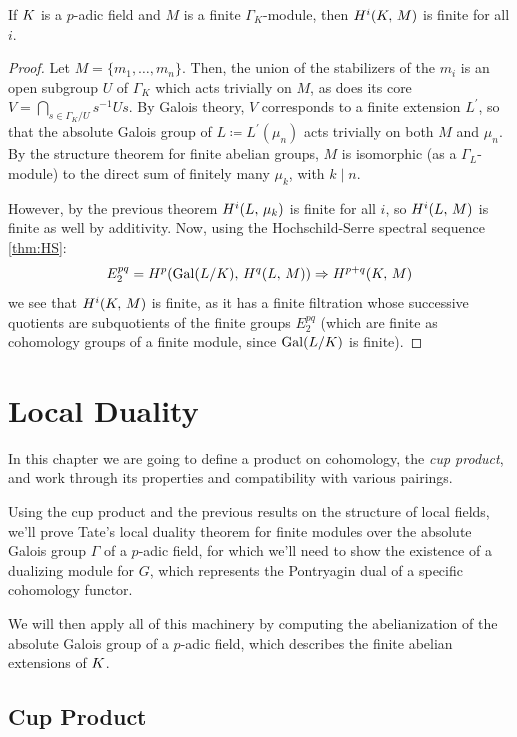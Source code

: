 \documentclass[a4paper, oneside]{memoir}
\begin{document}
\begin{corollary}\label{cor:FinCohom}
	If $K$ is a $p$-adic field and $M$ is a finite $\Gamma_K$-module, then
	\(H^{i}( K, \, M )\) is finite for all $i$.
\end{corollary}
\begin{proof}
	Let $M=\{m_1,\ldots,m_n\}$. Then, the union of the stabilizers of the $m_i$ is an open subgroup $U$ of $\Gamma_K$ which acts trivially on $M$, as does its core $V=\bigcap_{s\in \Gamma_K / U}{s^{-1}U s}$. By Galois theory, $V$ corresponds to a finite extension $L^{\prime}$, so that the absolute Galois group of $L\coloneqq L^{\prime}(\mu_n)$ acts trivially on both $M$ and $\mu_n$. By the structure theorem for finite abelian groups, $M$ is isomorphic (as a $\Gamma_L$-module) to the direct sum of finitely many $\mu_k$, with $k\mid n$.

	However, by the previous theorem $H^{i}( L, \, \mu_k )$ is finite for all $i$, so $H^{i}( L, \, M )$ is finite as well by additivity. Now, using the Hochschild-Serre spectral sequence \eqref{thm:HS}:
	\[
		E_2^{pq}= H^{p}( \mathrm{Gal}{(L / K)}, \, H^{q}( L, \, M ) ) \Rightarrow H^{p+q}( K, \, M )
	\]
	we see that $H^{i}( K, \, M )$ is finite, as it has a finite filtration whose successive quotients are subquotients of the finite groups $E_2^{pq}$ (which are finite as cohomology groups of a finite module, since $\mathrm{Gal}(L /K)$ is finite).
\end{proof}




\chapter{Local Duality}
In this chapter we are going to define a product on cohomology, the \textit{cup product}, and work through its properties and compatibility with various pairings.

Using the cup product and the previous results on the structure of local fields, we'll prove Tate's local duality theorem for finite modules over the absolute Galois group $\Gamma$ of a $p$-adic field, for which we'll need to show the existence of a dualizing module for $G$, which represents the Pontryagin dual of a specific cohomology functor.

We will then apply all of this machinery by computing the abelianization of the absolute Galois group of a $p$-adic field, which describes the finite abelian extensions of $K$.

\section{Cup Product}
\end{document}
